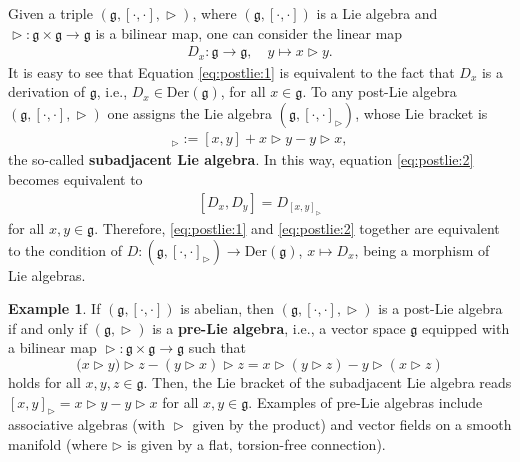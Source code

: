 \documentclass[10pt]{article}
\theoremstyle{definition}
\newtheorem{example}[lemma]{Example}
\newcommand{\g}{\mathfrak{g}}
\newcommand{\wt}{\vartriangleright}
\newcommand{\Der}{\mathrm{Der}}
\begin{document}
Given a triple $(\g,[\cdot,\cdot], \wt)$, where $(\g,[\cdot,\cdot])$ is a Lie algebra and $\wt: \g \times \g \to \g$ is a bilinear map, one can consider the linear map 
\begin{align}
D_x :\g \to \g, \quad y \mapsto x \wt y.
\end{align}
It is easy to see that Equation \eqref{eq:postlie:1} is equivalent to the fact that $D_x$ is a derivation of $\mathfrak{g}$, i.e., $D_x\in\Der(\g)$, for all $x\in\mathfrak{g}$. 
To any post-Lie algebra $(\g,[\cdot,\cdot], \wt)$ one assigns the Lie algebra $(\g,[\cdot,\cdot]_\wt)$, whose Lie bracket is 
\begin{align}
[x,y]_\wt := [x,y] + x \wt y - y \wt x,
\end{align}
the so-called \textbf{subadjacent Lie algebra}. In this way,
equation \eqref{eq:postlie:2} becomes equivalent to 
\begin{align}
\label{eq:interpretation-post-Lie}
[D_x, D_y] = D_{[x,y]_\wt}
\end{align}
for all $x,y\in\mathfrak{g}$. Therefore, \eqref{eq:postlie:1} and \eqref{eq:postlie:2} together are equivalent to the condition of $D: (\g,[\cdot,\cdot]_\wt) \to \Der(\g)$, $x \mapsto D_x$, being a morphism of Lie algebras.

\begin{example}
If $(\mathfrak{g},[\cdot,\cdot])$ is abelian, then $(\mathfrak{g},[\cdot,\cdot],\wt)$ is a post-Lie algebra if and only if $(\mathfrak{g},\wt)$ is a \textbf{pre-Lie algebra}, i.e., a vector space $\mathfrak{g}$ equipped with a bilinear map $\wt \colon \mathfrak{g}\times\mathfrak{g}\to\mathfrak{g}$ such that 
\begin{equation}\label{eq:preLie}
    \big(x\wt y)\wt z-(y\wt x)\wt z=x\wt(y\wt z)-y\wt(x\wt z)
\end{equation}
holds for all $x,y,z\in\mathfrak{g}$. Then, the Lie bracket of the subadjacent Lie algebra reads $[x,y]_\wt=x\wt y-y\wt x$ 
for all $x,y\in\mathfrak{g}$. Examples of pre-Lie algebras include associative algebras (with $\wt$ given by the product) and vector fields on a smooth manifold (where $\rhd$ is given by a flat, torsion-free connection).
\end{example}
\end{document}
